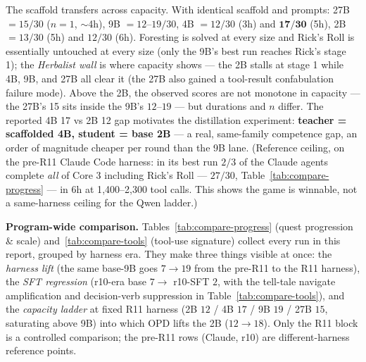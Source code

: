\documentclass[11pt]{article}
\begin{document}
The scaffold transfers across capacity. With identical scaffold and prompts:
27B $= 15/30$ ($n{=}1$, $\sim$4h), 9B $= 12$--$19/30$, 4B $= 12/30$ (3h) and $\mathbf{17/30}$
(5h), 2B $= 13/30$ (5h) and $12/30$ (6h). Foresting is solved at every size and Rick's Roll is
essentially untouched at every size (only the 9B's best run reaches Rick's stage 1); the
\emph{Herbalist wall} is where capacity shows --- the 2B stalls at stage 1 while 4B, 9B, and 27B
all clear it (the 27B also gained a tool-result confabulation failure mode). Above the 2B,
the observed scores are not monotone in capacity --- the 27B's 15 sits inside the 9B's
$12$--$19$ --- but durations and $n$ differ. The reported 4B 17 vs 2B 12 gap motivates the
distillation experiment: \textbf{teacher = scaffolded 4B, student =
base 2B} --- a real, same-family competence gap, an order of magnitude cheaper per round than the
9B lane. (Reference ceiling, on the pre-R11 Claude Code harness: in its best run $2/3$ of the
Claude agents complete \emph{all} of Core 3 including Rick's Roll --- $27/30$,
Table~\ref{tab:compare-progress} --- in 6h at 1{,}400--2{,}300 tool calls. This shows the game is
winnable, not a same-harness ceiling for the Qwen ladder.)

\textbf{Program-wide comparison.} Tables~\ref{tab:compare-progress} (quest progression \& scale)
and~\ref{tab:compare-tools} (tool-use signature) collect every run in this report, grouped by
harness era. They make three things visible at once: the \emph{harness lift} (the same base-9B
goes $7 \rightarrow 19$ from the pre-R11 to the R11 harness), the \emph{SFT regression} (r10-era
base $7 \rightarrow$ r10-SFT $2$, with the tell-tale navigate amplification and decision-verb
suppression in Table~\ref{tab:compare-tools}), and the \emph{capacity ladder} at fixed R11 harness
(2B $12$ / 4B $17$ / 9B $19$ / 27B $15$, saturating above 9B) into which OPD lifts the 2B
($12 \rightarrow 18$). Only the R11 block is a controlled comparison; the pre-R11 rows (Claude,
r10) are different-harness reference points.
\end{document}
